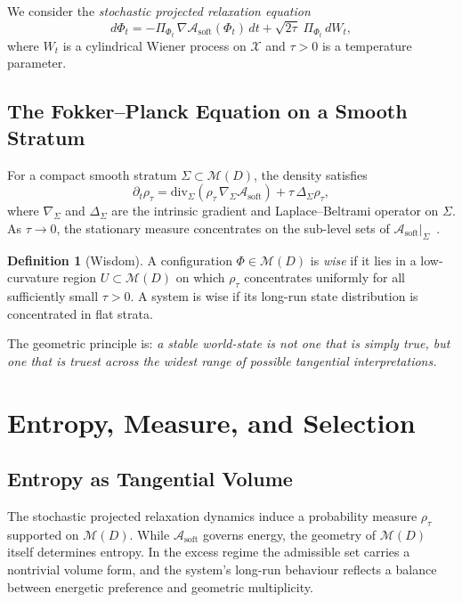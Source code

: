 \documentclass[12pt,oneside]{article}
\theoremstyle{plain}
\theoremstyle{definition}
\newtheorem{definition}[theorem]{Definition}
\theoremstyle{remark}
\newcommand{\X}{\mathcal{X}}
\newcommand{\M}{\mathcal{M}}
\newcommand{\D}{D}
\newcommand{\Sig}{\Sigma}
\newcommand{\rhotau}{\rho_\tau}
\newcommand{\Asoft}{\mathcal{A}_{\mathrm{soft}}}
\begin{document}
We consider the \emph{stochastic projected relaxation equation}
\[
  d\Phi_t = -\Pi_{\Phi_t}\,\nabla\Asoft(\Phi_t)\,dt
  + \sqrt{2\tau}\;\Pi_{\Phi_t}\,dW_t,
\]
where $W_t$ is a cylindrical Wiener process on $\X$ and $\tau > 0$ is a
temperature parameter.

\subsection{The Fokker--Planck Equation on a Smooth Stratum}

For a compact smooth stratum $\Sig \subset \M(\D)$, the density satisfies
\[
  \partial_t\rhotau
  = \mathrm{div}_\Sig(\rhotau\,\nabla_\Sig\Asoft)
  + \tau\,\Delta_\Sig\rhotau,
\]
where $\nabla_\Sig$ and $\Delta_\Sig$ are the intrinsic gradient and
Laplace--Beltrami operator on $\Sig$. As $\tau \to 0$, the stationary measure
concentrates on the sub-level sets of $\Asoft|_\Sig$~\cite{Otto2001,Friston2010}.

\begin{definition}[Wisdom]
\label{def:wisdom}
A configuration $\Phi \in \M(\D)$ is \emph{wise} if it lies in a low-curvature
region $U \subset \M(\D)$ on which $\rhotau$ concentrates uniformly for all
sufficiently small $\tau > 0$. A system is wise if its long-run state
distribution is concentrated in flat strata.
\end{definition}

The geometric principle is: \emph{a stable world-state is not one that is simply
true, but one that is truest across the widest range of possible tangential
interpretations.}

\section{Entropy, Measure, and Selection}
\label{sec:entropy}

\subsection{Entropy as Tangential Volume}

The stochastic projected relaxation dynamics induce a probability measure
$\rhotau$ supported on $\M(\D)$. While $\Asoft$ governs energy, the geometry of
$\M(\D)$ itself determines entropy. In the excess regime the admissible set
carries a nontrivial volume form, and the system's long-run behaviour reflects a
balance between energetic preference and geometric multiplicity.
\end{document}
